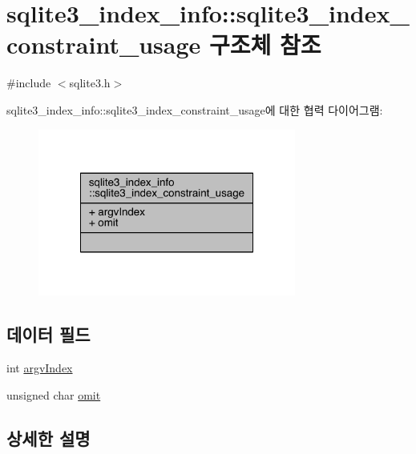 \hypertarget{structsqlite3__index__info_1_1sqlite3__index__constraint__usage}{}\section{sqlite3\+\_\+index\+\_\+info\+:\+:sqlite3\+\_\+index\+\_\+constraint\+\_\+usage 구조체 참조}
\label{structsqlite3__index__info_1_1sqlite3__index__constraint__usage}


{\ttfamily \#include $<$sqlite3.\+h$>$}



sqlite3\+\_\+index\+\_\+info\+:\+:sqlite3\+\_\+index\+\_\+constraint\+\_\+usage에 대한 협력 다이어그램\+:
\nopagebreak
\begin{figure}[H]
\begin{center}
\leavevmode
\includegraphics[width=240pt]{df/d4c/structsqlite3__index__info_1_1sqlite3__index__constraint__usage__coll__graph}
\end{center}
\end{figure}
\subsection*{데이터 필드}
\begin{DoxyCompactItemize}
\item 
int \hyperlink{structsqlite3__index__info_1_1sqlite3__index__constraint__usage_a2cbf680033c2937b3de226e091743a94}{argv\+Index}
\item 
unsigned char \hyperlink{structsqlite3__index__info_1_1sqlite3__index__constraint__usage_ad07fa17d30e4fb3abe23ceaf84edf0ef}{omit}
\end{DoxyCompactItemize}


\subsection{상세한 설명}



